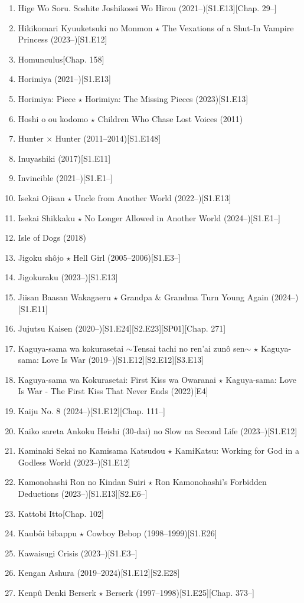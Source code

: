 \documentclass{article}
\begin{document}
\begin{enumerate}
    \item {\sc Hige Wo Soru. Soshite Joshikosei Wo Hirou} (2021--)\hfill[S1.E13][Chap. 29--]
    \item {\sc Hikikomari Kyuuketsuki no Monmon $\star$ The Vexations of a Shut-In Vampire Princess} (2023--)\hfill[S1.E12]
    \item {\sc Homunculus}\hfill[Chap. 158]
    \item {\sc Horimiya} (2021--)\hfill[S1.E13]
    \item {\sc Horimiya: Piece $\star$ Horimiya: The Missing Pieces} (2023)\hfill[S1.E13]
    \item {\sc Hoshi o ou kodomo $\star$ Children Who Chase Lost Voices} (2011)
    \item {\sc Hunter $\times$ Hunter} (2011--2014)\hfill[S1.E148]
    \item {\sc Inuyashiki} (2017)\hfill[S1.E11]
    \item Invincible (2021--)\hfill[S1.E1--]
    \item Isekai Ojisan $\star$ Uncle from Another World (2022--)\hfill[S1.E13]
    \item Isekai Shikkaku $\star$ No Longer Allowed in Another World (2024--)\hfill[S1.E1--]
    \item {\sc Isle of Dogs} (2018)
    \item Jigoku shôjo $\star$ Hell Girl (2005--2006)\hfill[S1.E3--]
    \item Jigokuraku (2023--)\hfill[S1.E13]
    \item {\sc Jiisan Baasan Wakagaeru $\star$ Grandpa \& Grandma Turn Young Again} (2024--)\hfill[S1.E11]
    \item {\sc Jujutsu Kaisen} (2020--)\hfill[S1.E24][S2.E23][SP01][Chap. 271]
    \item Kaguya-sama wa kokurasetai $\sim$Tensai tachi no ren'ai zun\^o sen$\sim$ $\star$ Kaguya-sama: Love Is War (2019--)\hfill[S1.E12][S2.E12][S3.E13]
    \item {\sc Kaguya-sama wa Kokurasetai: First Kiss wa Owaranai $\star$ Kaguya-sama: Love Is War - The First Kiss That Never Ends} (2022)\hfill[E4]
    \item Kaiju No. 8 (2024--)\hfill[S1.E12][Chap. 111--]
    \item Kaiko sareta Ankoku Heishi (30-dai) no Slow na Second Life (2023--)\hfill[S1.E12]
    \item {\sc Kaminaki Sekai no Kamisama Katsudou $\star$ KamiKatsu: Working for God in a Godless World} (2023--)\hfill[S1.E12]
    \item {\sc Kamonohashi Ron no Kindan Suiri $\star$ Ron Kamonohashi's Forbidden Deductions} (2023--)\hfill[S1.E13][S2.E6--]
    \item {\sc Kattobi Itto}\hfill[Chap. 102]
    \item {\sc Kaub\^oi bibappu $\star$ Cowboy Bebop} (1998--1999)\hfill[S1.E26]
    \item Kawaisugi Crisis (2023--)\hfill[S1.E3--]
    \item {\sc Kengan Ashura} (2019--2024)\hfill[S1.E12][S2.E28]
    \item {\sc Kenp\^u Denki Berserk $\star$ Berserk} (1997--1998)\hfill[S1.E25][Chap. 373--]
    

\end{enumerate}
\end{document}
